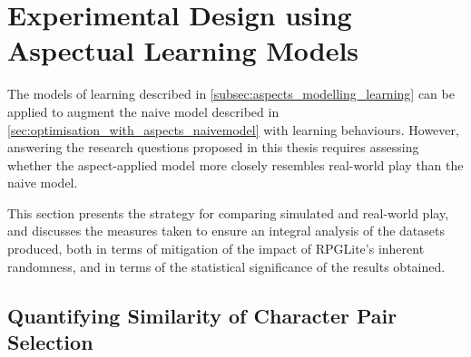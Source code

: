 \section{Experimental Design using Aspectual Learning Models}\label{sec:optimisation_with_aspects_experimental_design}


The models of learning described in \cref{subsec:aspects_modelling_learning} can be applied to augment the naive
model described in \cref{sec:optimisation_with_aspects_naivemodel} with learning behaviours. However,
answering the research questions proposed in this thesis requires assessing whether the aspect-applied model
more closely resembles real-world play than the naive model. 

This section presents the strategy for comparing simulated and real-world play, and discusses the 
measures taken to ensure an integral analysis of the datasets produced, both in terms of mitigation of
the impact of RPGLite's inherent randomness, and in terms of the statistical significance of the results obtained.

\subsection{Quantifying Similarity of Character Pair Selection}


